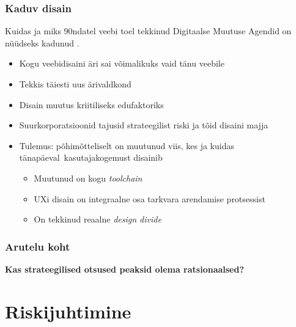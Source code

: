 \begin{frame}[fragile]
  \frametitle{Kaduv disain}
  Kuidas ja miks 90ndatel veebi toel tekkinud Digitaalse Muutuse Agendid on nüüdseks kadunud \citep{design}. 
	\begin{itemize}
		\item Kogu veebidisaini äri sai võimalikuks vaid tänu veebile
		\item Tekkis täiesti uus ärivaldkond
		\item Disain muutus kriitiliseks edufaktoriks
		\item Suurkorporatsioonid tajusid strateegilist riski ja tõid disaini majja
		\item Tulemus: põhimõtteliselt on muutunud viis, kes ja kuidas tänapäeval kasutajakogemust disainib
		\begin{itemize}
			\item Muutunud on kogu \emph{toolchain}
			\item UXi disain on integraalne osa tarkvara arendamise protsessist
			\item On tekkinud reaalne \emph{design divide}
		\end{itemize}		
	\end{itemize}
\end{frame}

\begin{frame}[fragile]
  \frametitle{Arutelu koht}
		\begin{center}
			\textbf{Kas strateegilised otsused peaksid olema ratsionaalsed?}
		\end{center}
\end{frame}

\section{Riskijuhtimine}

